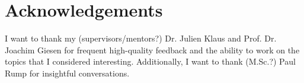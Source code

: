 \chapter{Acknowledgements}

I want to thank my (supervisors/mentors?) Dr. Julien Klaus and Prof. Dr. Joachim Giesen
for frequent high-quality feedback
and the ability to work on the topics that I considered interesting.
Additionally, I want to thank (M.Sc.?) Paul Rump for insightful conversations.